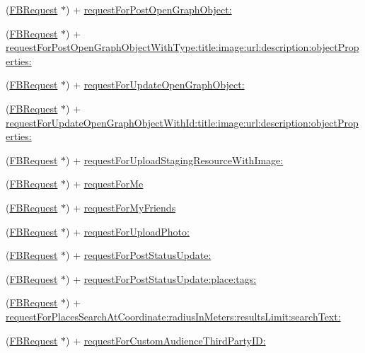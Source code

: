 \begin{DoxyCompactItemize}
\item 
(\hyperlink{interfaceFBRequest}{F\+B\+Request} $\ast$) + \hyperlink{interfaceFBRequest_a7eed076cb1c83e3dfe4f29ccfebe68b4}{request\+For\+Post\+Open\+Graph\+Object\+:}
\item 
(\hyperlink{interfaceFBRequest}{F\+B\+Request} $\ast$) + \hyperlink{interfaceFBRequest_aa5c66ef020233f0de4a26473a8b7c87b}{request\+For\+Post\+Open\+Graph\+Object\+With\+Type\+:title\+:image\+:url\+:description\+:object\+Properties\+:}
\item 
(\hyperlink{interfaceFBRequest}{F\+B\+Request} $\ast$) + \hyperlink{interfaceFBRequest_ab92e50866d79923cfb17f1f96f06530b}{request\+For\+Update\+Open\+Graph\+Object\+:}
\item 
(\hyperlink{interfaceFBRequest}{F\+B\+Request} $\ast$) + \hyperlink{interfaceFBRequest_a9accf3aae3b94802e07a0358979bf37d}{request\+For\+Update\+Open\+Graph\+Object\+With\+Id\+:title\+:image\+:url\+:description\+:object\+Properties\+:}
\item 
(\hyperlink{interfaceFBRequest}{F\+B\+Request} $\ast$) + \hyperlink{interfaceFBRequest_a4a85038bef70a9edd91a56ab0db0bfd6}{request\+For\+Upload\+Staging\+Resource\+With\+Image\+:}
\item 
(\hyperlink{interfaceFBRequest}{F\+B\+Request} $\ast$) + \hyperlink{interfaceFBRequest_a1a8fb083c2d09cbbc5ae9afd33e2381f}{request\+For\+Me}
\item 
(\hyperlink{interfaceFBRequest}{F\+B\+Request} $\ast$) + \hyperlink{interfaceFBRequest_a95570ea8628f71b3c311da8378729cc6}{request\+For\+My\+Friends}
\item 
(\hyperlink{interfaceFBRequest}{F\+B\+Request} $\ast$) + \hyperlink{interfaceFBRequest_a871fdb57a3c9907a5d2b788ca442c586}{request\+For\+Upload\+Photo\+:}
\item 
(\hyperlink{interfaceFBRequest}{F\+B\+Request} $\ast$) + \hyperlink{interfaceFBRequest_a0a745a53f4764835bd0945bd66fe10fd}{request\+For\+Post\+Status\+Update\+:}
\item 
(\hyperlink{interfaceFBRequest}{F\+B\+Request} $\ast$) + \hyperlink{interfaceFBRequest_a5560f9786dcf54ca907153c611f991ed}{request\+For\+Post\+Status\+Update\+:place\+:tags\+:}
\item 
(\hyperlink{interfaceFBRequest}{F\+B\+Request} $\ast$) + \hyperlink{interfaceFBRequest_a1965c2185e0d9c98e19d0edd20180ab8}{request\+For\+Places\+Search\+At\+Coordinate\+:radius\+In\+Meters\+:results\+Limit\+:search\+Text\+:}
\item 
(\hyperlink{interfaceFBRequest}{F\+B\+Request} $\ast$) + \hyperlink{interfaceFBRequest_a17f11f5dad042b4109b3a001300d6916}{request\+For\+Custom\+Audience\+Third\+Party\+I\+D\+:}

\end{DoxyCompactItemize}
